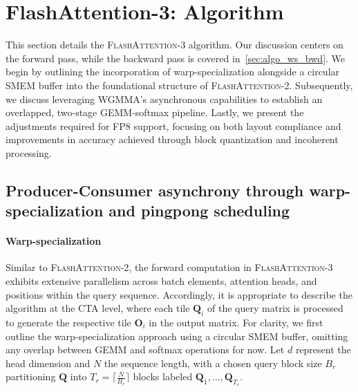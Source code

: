 \section{FlashAttention-3: Algorithm}
\label{sec:algo}

This section details the \textsc{FlashAttention-3} algorithm. Our discussion centers on the forward pass, while the backward pass is covered in~\cref{sec:algo_ws_bwd}. We begin by outlining the incorporation of warp-specialization alongside a circular SMEM buffer into the foundational structure of \textsc{FlashAttention-2}. Subsequently, we discuss leveraging WGMMA’s asynchronous capabilities to establish an overlapped, two-stage GEMM-softmax pipeline. Lastly, we present the adjustments required for FP8 support, focusing on both layout compliance and improvements in accuracy achieved through block quantization and incoherent processing.

\subsection{Producer-Consumer asynchrony through warp-specialization and pingpong scheduling}
\label{sec:algo_ws}

\paragraph{Warp-specialization}
Similar to \textsc{FlashAttention-2}, the forward computation in \textsc{FlashAttention-3} exhibits extensive parallelism across batch elements, attention heads, and positions within the query sequence. Accordingly, it is appropriate to describe the algorithm at the CTA level, where each tile $\mathbf{Q}_i$ of the query matrix is processed to generate the respective tile $\mathbf{O}_i$ in the output matrix. For clarity, we first outline the warp-specialization approach using a circular SMEM buffer, omitting any overlap between GEMM and softmax operations for now. Let $d$ represent the head dimension and $N$ the sequence length, with a chosen query block size $B_r$ partitioning $\mathbf{Q}$ into $T_r = \lceil \frac{N}{B_r} \rceil$ blocks labeled $\mathbf{Q}_1, \ldots, \mathbf{Q}_{T_r}$.


